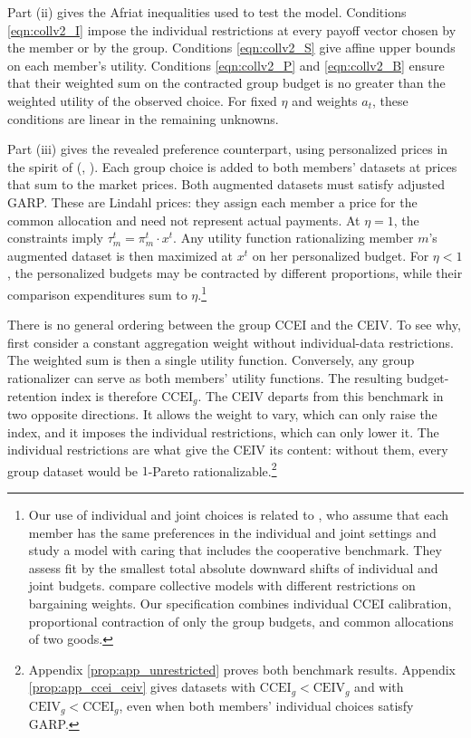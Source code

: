 \documentclass[11 pt]{article}
\begin{document}
Part (ii) gives the Afriat inequalities used to test the model. Conditions \eqref{eqn:collv2_I} impose the individual restrictions at every payoff vector chosen by the member or by the group. Conditions \eqref{eqn:collv2_S} give affine upper bounds on each member's utility. Conditions \eqref{eqn:collv2_P} and \eqref{eqn:collv2_B} ensure that their weighted sum on the contracted group budget is no greater than the weighted utility of the observed choice. For fixed $\eta$ and weights $a_t$, these conditions are linear in the remaining unknowns.

Part (iii) gives the revealed preference counterpart, using personalized prices in the spirit of \citeauthor{cherchye2007} (\citeyear{cherchye2007}, \citeyear{cherchye2011}). Each group choice is added to both members' datasets at prices that sum to the market prices. Both augmented datasets must satisfy adjusted GARP. These are Lindahl prices: they assign each member a price for the common allocation and need not represent actual payments. At $\eta=1$, the constraints imply $\tau_m^t=\pi_m^t\cdot x^t$. Any utility function rationalizing member $m$'s augmented dataset is then maximized at $x^t$ on her personalized budget. For $\eta<1$, the personalized budgets may be contracted by different proportions, while their comparison expenditures sum to $\eta$.\footnote{Our use of individual and joint choices is related to \citet{cherchye2020caring}, who assume that each member has the same preferences in the individual and joint settings and study a model with caring that includes the cooperative benchmark. They assess fit by the smallest total absolute downward shifts of individual and joint budgets. \citet{bruyneel2012restricted} compare collective models with different restrictions on bargaining weights. Our specification combines individual CCEI calibration, proportional contraction of only the group budgets, and common allocations of two goods.}

There is no general ordering between the group CCEI and the CEIV. To see why, first consider a constant aggregation weight without individual-data restrictions. The weighted sum is then a single utility function. Conversely, any group rationalizer can serve as both members' utility functions. The resulting budget-retention index is therefore $\mathrm{CCEI}_g$. The CEIV departs from this benchmark in two opposite directions. It allows the weight to vary, which can only raise the index, and it imposes the individual restrictions, which can only lower it. The individual restrictions are what give the CEIV its content: without them, every group dataset would be $1$-Pareto rationalizable.\footnote{Appendix \autoref{prop:app_unrestricted} proves both benchmark results. Appendix \autoref{prop:app_ccei_ceiv} gives datasets with $\mathrm{CCEI}_g<\mathrm{CEIV}_g$ and with $\mathrm{CEIV}_g<\mathrm{CCEI}_g$, even when both members' individual choices satisfy GARP.}
\end{document}
